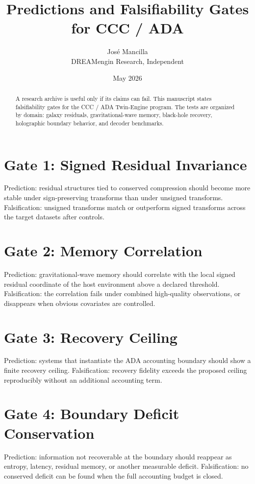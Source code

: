 \documentclass[11pt]{article}
\title{Predictions and Falsifiability Gates for CCC / ADA}
\author{José Mancilla\\DREAMengin Research, Independent}
\date{May 2026}
\begin{document}
\maketitle

\begin{abstract}
A research archive is useful only if its claims can fail. This manuscript states falsifiability gates for the CCC / ADA Twin-Engine program. The tests are organized by domain: galaxy residuals, gravitational-wave memory, black-hole recovery, holographic boundary behavior, and decoder benchmarks.
\end{abstract}

\section{Gate 1: Signed Residual Invariance}
Prediction: residual structures tied to conserved compression should become more stable under sign-preserving transforms than under unsigned transforms. Falsification: unsigned transforms match or outperform signed transforms across the target datasets after controls.

\section{Gate 2: Memory Correlation}
Prediction: gravitational-wave memory should correlate with the local signed residual coordinate of the host environment above a declared threshold. Falsification: the correlation fails under combined high-quality observations, or disappears when obvious covariates are controlled.

\section{Gate 3: Recovery Ceiling}
Prediction: systems that instantiate the ADA accounting boundary should show a finite recovery ceiling. Falsification: recovery fidelity exceeds the proposed ceiling reproducibly without an additional accounting term.

\section{Gate 4: Boundary Deficit Conservation}
Prediction: information not recoverable at the boundary should reappear as entropy, latency, residual memory, or another measurable deficit. Falsification: no conserved deficit can be found when the full accounting budget is closed.
\end{document}
